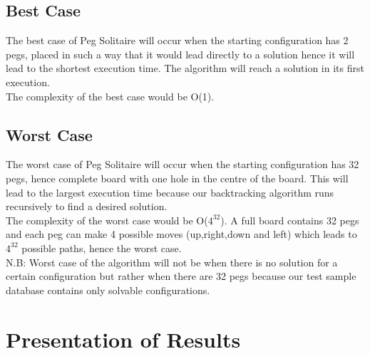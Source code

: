 \documentclass{article}
\begin{document}
\subsection{Best Case}
The best case of Peg Solitaire will occur when the starting configuration has 2 pegs, placed in such a way that it would lead directly to a solution hence it will lead to the shortest execution time. The algorithm will reach a solution in its first execution.
\\The complexity of the best case would be O(1).
\subsection{Worst Case}
The worst case of Peg Solitaire will occur when the starting configuration has 32 pegs, hence complete board with one hole in the centre of the board. This will lead to the largest execution time because our backtracking algorithm runs recursively to find a desired solution.
\\The complexity of the worst case would be O($4^{32}$). A full board contains 32 pegs and each peg can make 4 possible moves (up,right,down and left) which leads to $4^{32}$ possible paths, hence the worst case.
\\N.B: Worst case of the algorithm will not be when there is no solution for a certain configuration but rather when there are 32 pegs because our test sample database contains only solvable configurations.

\section{Presentation of Results}
\end{document}
